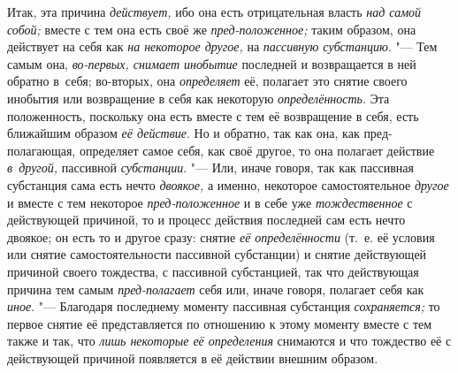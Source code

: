 Итак, эта причина {\em действует,} ибо она есть отрицательная власть
{\em над самой собой;} вместе с тем она есть своё же {\em пред-положенное;}
таким образом, она действует на себя как {\em на некоторое другое,} на
{\em пассивную субстанцию}. "--- Тем самым она,
{\em во-первых, снимает инобытие} последней и возвращается в ней обратно
в~себя; во-вторых, она {\em определяет} её, полагает это снятие своего инобытия
или возвращение в себя как некоторую {\em определённость}. Эта положенность,
поскольку она есть вместе с тем её возвращение в себя, есть ближайшим образом
{\em её действие}. Но и обратно, так как она, как пред-полагающая, определяет
самое себя, как своё другое, то она полагает действие {\em в~другой,} пассивной
{\em субстанции}. "--- Или, иначе говоря, так как пассивная субстанция сама
есть нечто {\em двоякое,} а именно, некоторое самостоятельное {\em другое} и
вместе с тем некоторое {\em пред-положенное} и в себе уже {\em тождественное}
с действующей причиной, то и процесс действия последней сам есть нечто двоякое;
он есть то и другое сразу: снятие {\em её определённости} (т.~е. её условия или
снятие самостоятельности пассивной субстанции) и снятие действующей причиной
своего тождества, с пассивной субстанцией, так что действующая причина тем
самым {\em пред-полагает} себя или, иначе говоря, полагает себя как
{\em иное}. "--- Благодаря последнему моменту пассивная субстанция
{\em сохраняется;} то первое снятие её представляется по отношению к этому
моменту вместе с тем также и так, что {\em лишь некоторые её определения}
снимаются и что тождество её с действующей причиной появляется
в её действии внешним образом.

